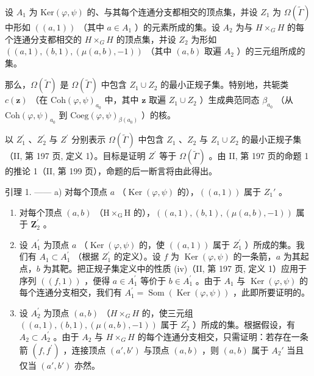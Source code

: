   设 \(A_{1}\) 为 \(\mathrm{Ker}(\varphi,\psi)\) 的、与其每个连通分支都相交的顶点集，并设 \(Z_{1}\) 为 \(\Omega(\widetilde{\Gamma})\) 中形如 \(((a,1))\) （其中 \(a\in A_{1}\) ）的元素所成的集。设 \(A_{2}\) 为与 \(H\times_{G}H\) 的每个连通分支都相交的 \(H\times_{G}H\) 的顶点集，并设 \(Z_{2}\) 为形如 \(((a,1),(b,1),(\mu(a,b),-1))\) （其中 \((a,b)\) 取遍 \(A_{2}\) ）的三元组所成的集。

那么，\(\Omega(\widetilde{\Gamma})\) 是 \(\Omega(\widetilde{\Gamma})\) 中包含 \(Z_1 \cup Z_2\) 的最小正规子集。特别地，共轭类 \(c(\mathbf{z})\) （在 \(\mathrm{Coh}(\varphi, \psi)_{a_0}\) 中，其中 \(\mathbf{z}\) 取遍 \(Z_1 \cup Z_2\) ）生成典范同态 \(\beta_{a_0}\) （从 \(\mathrm{Coh}(\varphi, \psi)_{a_0}\) 到 \(\mathrm{Coeg}(\varphi, \psi)_{\beta(a_0)}\) ）的核。

以 \(Z_{1}^{\prime}\) 、\(Z_{2}^{\prime}\) 与 \(Z^{\prime}\) 分别表示 \(\Omega(\widetilde{\Gamma})\) 中包含 \(Z_{1}\) 、\(Z_{2}\) 与 \(Z_{1} \cup Z_{2}\) 的最小正规子集（II, 第 197 页, 定义 1）。目标是证明 \(Z^{\prime}\) 等于 \(\Omega(\widetilde{\Gamma})\) 。由 II, 第 197 页的命题 1 的推论 1（II, 第 199 页），命题的后一断言将由此得出。

引理 1. —— a) 对每个顶点 \(a\) （\(\operatorname{Ker}(\varphi, \psi)\) 的），\(((a, 1))\) 属于 \(Z_1'\) 。

\begin{enumerate}
\def\labelenumi{\alph{enumi})}
\setcounter{enumi}{1}
\item
  对每个顶点 \((a,b)\) （\(\mathrm{H}\times_{\mathrm{G}}\mathrm{H}\) 的），\(((a,1),(b,1),(\mu(a,b),-1))\) 属于 \(\mathbf{Z}_2^{\prime}\) 。
\item
  设 \(A_{1}^{\prime}\) 为顶点 \(a\) （\(\operatorname{Ker}(\varphi,\psi)\) 的，使 \(((a,1))\) 属于 \(Z_{1}^{\prime}\) ）所成的集。我们有 \(A_{1}\subset A_{1}^{\prime}\) （根据 \(Z_{1}^{\prime}\) 的定义）。设 \(f\) 为 \(\operatorname{Ker}(\varphi,\psi)\) 的一条箭，\(a\) 为其起点，\(b\) 为其靶。把正规子集定义中的性质 (iv)（II, 第 197 页, 定义 1）应用于序列 \(((f,1))\) ，便得 \(a\in A_{1}^{\prime}\) 等价于 \(b\in A_{1}^{\prime}\) 。由于 \(A_{1}\) 与 \(\operatorname{Ker}(\varphi,\psi)\) 的每个连通分支相交，我们有 \(A_{1}^{\prime}=\operatorname{Som}(\operatorname{Ker}(\varphi,\psi))\) ，此即所要证明的。
\item
  设 \(A_{2}^{\prime}\) 为顶点 \((a,b)\) （\(H \times_{G} H\) 的，使三元组 \(((a,1),(b,1),(\mu(a,b),-1))\) 属于 \(Z_{2}^{\prime}\) ）所成的集。根据假设，有 \(A_{2} \subset A_{2}^{\prime}\) 。由于 \(A_{2}\) 与 \(H \times_{G} H\) 的每个连通分支相交，只需证明：若存在一条箭 \((f,f^{\prime})\) ，连接顶点 \((a', b')\) 与顶点 \((a, b)\) ，则 \((a, b)\) 属于 \(A_2'\) 当且仅当 \((a', b')\) 亦然。
\end{enumerate}

